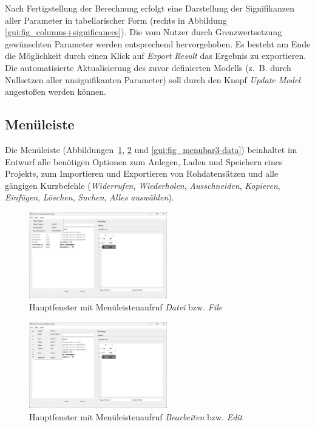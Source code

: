 \documentclass{article}
\begin{document}
Nach Fertigstellung der Berechnung erfolgt eine Darstellung der Signifikanzen aller Parameter in tabellarischer Form (rechts in Abbildung \ref{gui:fig_columns+significances}). Die vom Nutzer durch Grenzwertsetzung gewünschten Parameter werden entsprechend hervorgehoben. Es besteht am Ende die Möglichkeit durch einen Klick auf \emph{Export Result} das Ergebnis zu exportieren. Die automatisierte Aktualisierung des zuvor definierten Modells (z.~B. durch Nullsetzen aller unsignifikanten Parameter) soll durch den Knopf \emph{Update Model} angestoßen werden können.\\

\newpage
\subsection{Menüleiste}

Die Menüleiste (Abbildungen~\ref{gui:fig_menubar1-file}, \ref{gui:fig_menubar2-edit} und \ref{gui:fig_menubar3-data}) beinhaltet im Entwurf alle benötigen Optionen zum Anlegen, Laden und Speichern eines Projekts, zum Importieren und Exportieren von Rohdatensätzen und alle gängigen Kurzbefehle (\emph{Widerrufen}, \emph{Wiederholen}, \emph{Ausschneiden}, \emph{Kopieren}, \emph{Einfügen}, \emph{Löschen}, \emph{Suchen}, \emph{Alles auswählen}).

\begin{figure}[H]%
  \centering
  \includegraphics[width=6cm,trim={0 12cm 18cm 0},clip]{specifications/img/gui-screenshots/menubar1-file.png}
  \caption{Hauptfenster mit Menüleistenaufruf \emph{Datei} bzw. \emph{File}}
  \label{gui:fig_menubar1-file}
\end{figure}

\begin{figure}[H]%
  \centering
  \includegraphics[width=6cm,trim={0 8cm 18cm 0},clip]{specifications/img/gui-screenshots/menubar2-edit.png}
  \caption{Hauptfenster mit Menüleistenaufruf \emph{Bearbeiten} bzw. \emph{Edit}}
  \label{gui:fig_menubar2-edit}
\end{figure}
\end{document}
